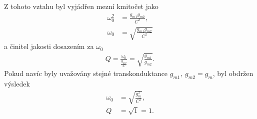 Z tohoto vztahu byl vyjádřen mezní kmitočet jako 
\begin{align}
\omega _0^2 &= \frac{g_{m1}g_{m2}}{C^2}, \\
\omega _0 &= \sqrt{\frac{g_{m1}g_{m2}}{C^2}}
\end{align}
a činitel jakosti dosazením za $\omega _0$
\begin{align}
Q = \frac{\omega _0}{\frac{g_{m2}}{C}} = \sqrt{\frac{g_{m1}}{g_{m2}}}.
\end{align}
Pokud navíc byly uvažovány stejné transkonduktance $g_{m1}, \ g_{m2} = g_m$, byl obdržen výsledek
\begin{align}
\omega _0 &= \sqrt{\frac{g_m^2}{C^2}},\\
Q &= \sqrt{1} = 1.
\end{align}